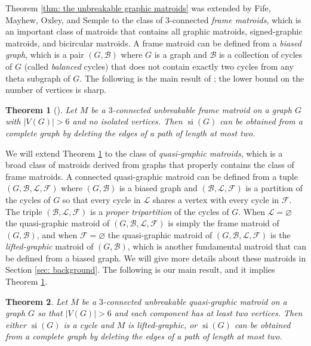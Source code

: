 \documentclass[12pt]{article}
\newtheorem{theorem}{Theorem}[section]
\theoremstyle{definition}
\theoremstyle{plain} %
\newcommand{\cB}{\mathcal{B}}
\newcommand{\cF}{\mathcal{F}}
\newcommand{\cL}{\mathcal{L}}
\DeclareMathOperator{\si}{si}
\begin{document}
Theorem \ref{thm: the unbreakable graphic matroids} was extended by Fife, Mayhew, Oxley, and Semple \cite{Fife-Mayhew-Oxley-Semple2020} to the class of $3$-connected \emph{frame matroids}, which is an important class of matroids that contains all graphic matroids, signed-graphic matroids, and bicircular matroids.
A frame matroid can be defined from a \emph{biased graph}, which is a pair $(G, \cB)$ where $G$ is a graph and $\cB$ is a collection of cycles of $G$ (called \emph{balanced} cycles) that does not contain exactly two cycles from any theta subgraph of $G$.
The following is the main result of \cite{Fife-Mayhew-Oxley-Semple2020}; the lower bound on the number of vertices is sharp.

\begin{theorem}[{\cite[Theorem 1.2]{Fife-Mayhew-Oxley-Semple2020}}] \label{thm: the unbreakable frame matroids}
Let $M$ be a $3$-connected unbreakable frame matroid on a graph $G$ with $|V(G)| > 6$ and no isolated vertices.
Then $\si(G)$ can be obtained from a complete graph by deleting the edges of a path of length at most two.
\end{theorem}




We will extend Theorem \ref{thm: the unbreakable frame matroids} to the class of \emph{quasi-graphic matroids}, which is a broad class of matroids derived from graphs that properly contains the class of frame matroids.
A connected quasi-graphic matroid can be defined from a tuple $(G, \cB, \cL, \cF)$ where $(G, \cB)$ is a biased graph and $(\cB,\cL, \cF)$ is a partition of the cycles of $G$ so that every cycle in $\cL$ shares a vertex with every cycle in $\cF$.
The triple $(\cB, \cL, \cF)$ is a \emph{proper tripartition} of the cycles of $G$.
When $\cL = \varnothing$ the quasi-graphic matroid of $(G, \cB, \cL, \cF)$ is simply the frame matroid of $(G, \cB)$, and when $\cF = \varnothing$ the quasi-graphic matroid of $(G, \cB, \cL, \cF)$ is the \emph{lifted-graphic} matroid of $(G, \cB)$, which is another fundamental matroid that can be defined from a biased graph.
We will give more details about these matroids in Section \ref{sec: background}.
The following is our main result, and it implies Theorem \ref{thm: the unbreakable frame matroids}.


\begin{theorem} \label{thm: main}
Let $M$ be a $3$-connected unbreakable quasi-graphic matroid on a graph $G$ so that $|V(G)| > 6$ and each component has at least two vertices.
Then either $\si(G)$ is a cycle and $M$ is lifted-graphic, or $\si(G)$ can be obtained from a complete graph by deleting the edges of a path of length at most two.
\end{theorem}
\end{document}
